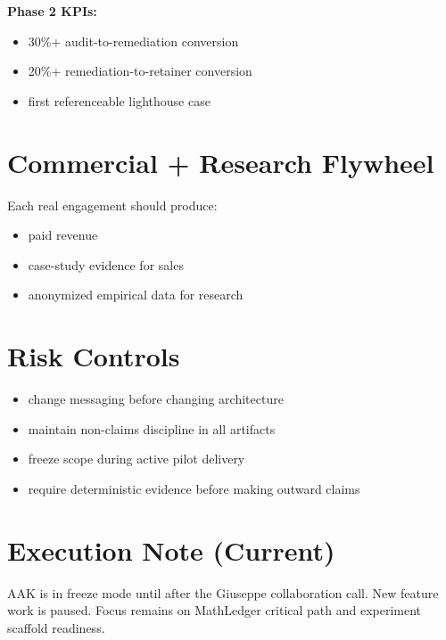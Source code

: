 \documentclass[11pt]{article}
\begin{document}
\textbf{Phase 2 KPIs:}
\begin{itemize}
  \item 30\%+ audit-to-remediation conversion
  \item 20\%+ remediation-to-retainer conversion
  \item first referenceable lighthouse case
\end{itemize}

\section*{Commercial + Research Flywheel}
Each real engagement should produce:
\begin{itemize}
  \item paid revenue
  \item case-study evidence for sales
  \item anonymized empirical data for research
\end{itemize}

\section*{Risk Controls}
\begin{itemize}
  \item change messaging before changing architecture
  \item maintain non-claims discipline in all artifacts
  \item freeze scope during active pilot delivery
  \item require deterministic evidence before making outward claims
\end{itemize}

\section*{Execution Note (Current)}
AAK is in freeze mode until after the Giuseppe collaboration call. New feature work is paused. Focus remains on MathLedger critical path and experiment scaffold readiness.
\end{document}

